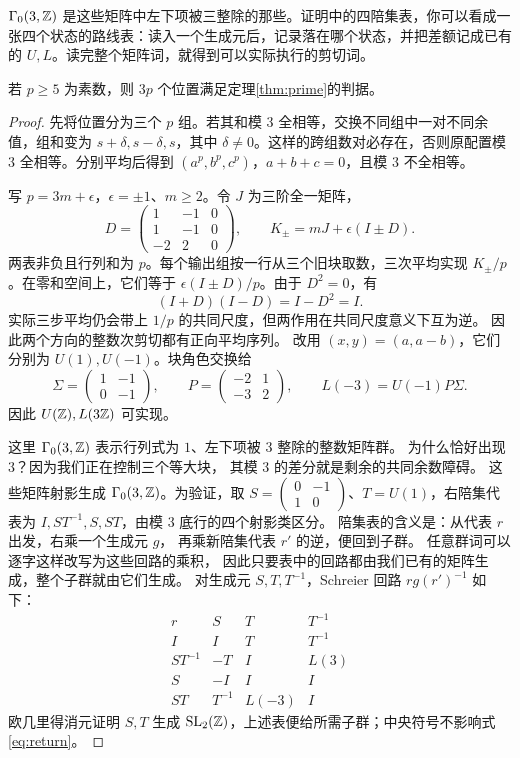 $\Gamma_0(3,\mathbb Z)$ 是这些矩阵中左下项被三整除的那些。证明中的四陪集表，你可以看成一张四个状态的路线表：读入一个生成元后，记录落在哪个状态，并把差额记成已有的 $U,L$。读完整个矩阵词，就得到可以实际执行的剪切词。
\begin{proposition}[3p个位置的独立解法]\label{prop:threep}
若 $p\ge5$ 为素数，则 $3p$ 个位置满足定理\ref{thm:prime}的判据。
\end{proposition}
\begin{proof}
先将位置分为三个 $p$ 组。若其和模 $3$ 全相等，交换不同组中一对不同余值，组和变为 $s+\delta,s-\delta,s$，其中 $\delta\ne0$。这样的跨组数对必存在，否则原配置模 $3$ 全相等。分别平均后得到 $(a^p,b^p,c^p)$，$a+b+c=0$，且模 $3$ 不全相等。

写 $p=3m+\epsilon$，$\epsilon=\pm1$、$m\ge2$。令 $J$ 为三阶全一矩阵，
\[
D=\begin{pmatrix}1&-1&0\\1&-1&0\\-2&2&0\end{pmatrix},\qquad
K_\pm=mJ+\epsilon(I\pm D).
\]
两表非负且行列和为 $p$。每个输出组按一行从三个旧块取数，三次平均实现 $K_\pm/p$。在零和空间上，它们等于 $\epsilon(I\pm D)/p$。由于 $D^2=0$，有
\[
(I+D)(I-D)=I-D^2=I.
\]
实际三步平均仍会带上 $1/p$ 的共同尺度，但两作用在共同尺度意义下互为逆。
因此两个方向的整数次剪切都有正向平均序列。
改用 $(x,y)=(a,a-b)$，它们分别为 $U(1),U(-1)$。块角色交换给
\[
\Sigma=\begin{pmatrix}1&-1\\0&-1\end{pmatrix},\qquad
P=\begin{pmatrix}-2&1\\-3&2\end{pmatrix},\qquad
L(-3)=U(-1)P\Sigma.
\]
因此 $U(\mathbb Z),L(3\mathbb Z)$ 可实现。


这里 $\Gamma_0(3,\mathbb Z)$ 表示行列式为 $1$、左下项被 $3$ 整除的整数矩阵群。
为什么恰好出现 $3$？因为我们正在控制三个等大块，
其模 $3$ 的差分就是剩余的共同余数障碍。
这些矩阵射影生成 $\Gamma_0(3,\mathbb Z)$。为验证，取 $S=\left(\begin{smallmatrix}0&-1\\1&0\end{smallmatrix}\right)$、$T=U(1)$，右陪集代表为 $I,ST^{-1},S,ST$，由模 $3$ 底行的四个射影类区分。
陪集表的含义是：从代表 $r$ 出发，右乘一个生成元 $g$，
再乘新陪集代表 $r'$ 的逆，便回到子群。
任意群词可以逐字这样改写为这些回路的乘积，
因此只要表中的回路都由我们已有的矩阵生成，整个子群就由它们生成。
对生成元 $S,T,T^{-1}$，Schreier 回路 $rg(r')^{-1}$ 如下：
\[
\begin{array}{c|ccc}
r&S&T&T^{-1}\\\hline
I&I&T&T^{-1}\\
ST^{-1}&-T&I&L(3)\\
S&-I&I&I\\
ST&T^{-1}&L(-3)&I
\end{array}
\]
欧几里得消元证明 $S,T$ 生成 $\operatorname{SL}_2(\mathbb Z)$，上述表便给所需子群；中央符号不影响式\eqref{eq:return}。


\end{proof}
